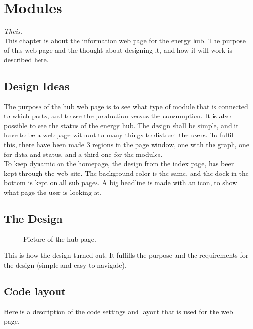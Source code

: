 \newpage
\chapter{Modules}\textit{Theis.}\\
This chapter is about the information web page for the energy hub. The purpose of this web page and the thought about designing it, and how it will work is described here.
\section{Design Ideas}
The purpose of the hub web page is to see what type of module that is connected to which ports, and to see the production versus the consumption. It is also possible to see the status of the energy hub. The design shall be simple, and it have to be a web page without to many things to distract the users. To fulfill this, there have been made 3 regions in the page window, one with the graph, one for data and status, and a third one for the modules.\\
To keep dynamic on the homepage, the design from the index page, has been kept through the web site. The background color is the same, and the dock in the bottom is kept on all sub pages. A big headline is made with an icon, to show what page the user is looking at.
\section{The Design}

\begin{figure}[h!]
	\center
		\setlength\fboxsep{0pt}
		\setlength\fboxrule{1pt}
   	\caption{Picture of the hub page.}
   	\label{fig:hub_page_design}
\end{figure}
This is how the design turned out. It fulfills the purpose and the requirements for the design (simple and easy to navigate).
\section{Code layout}
Here is a description of the code settings and layout that is used for the web page.
